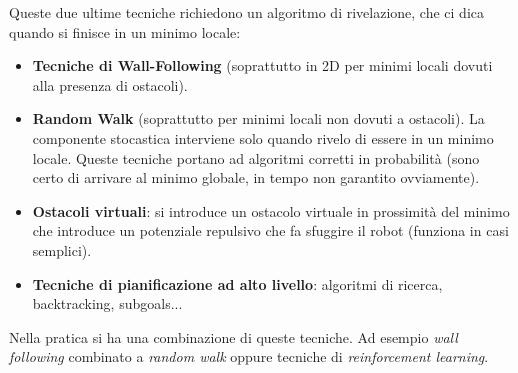 Queste due ultime tecniche richiedono un algoritmo di rivelazione, che ci dica quando si finisce in un minimo locale:
\begin{itemize}
\item \textbf{Tecniche di Wall-Following} (soprattutto in 2D per minimi locali dovuti alla presenza di ostacoli).
\item \textbf{Random Walk} (soprattutto per minimi locali non dovuti a ostacoli). La componente stocastica interviene solo quando rivelo di essere in un minimo locale. Queste tecniche portano ad algoritmi corretti in probabilit\`a (sono certo di arrivare al minimo globale, in tempo non garantito ovviamente).
\item \textbf{Ostacoli virtuali}: si introduce un ostacolo virtuale in prossimit\`a del minimo che introduce un potenziale repulsivo che fa sfuggire il robot (funziona in casi semplici).
\item \textbf{Tecniche di pianificazione ad alto livello}: algoritmi di ricerca, backtracking, subgoals...
\end{itemize}
Nella pratica si ha una combinazione di queste tecniche. Ad esempio \textit{wall following} combinato a \textit{random walk} oppure tecniche di \textit{reinforcement learning}.

